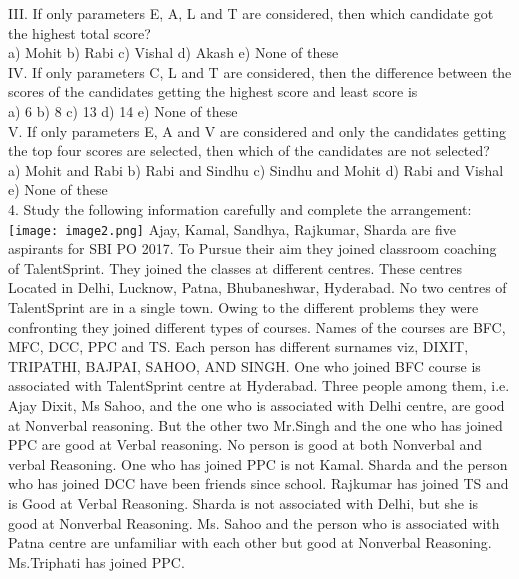 \documentclass[
]{article}
\begin{document}
III. If only parameters E, A, L and T are considered, then which candidate got the highest
total score?\\
a) Mohit \hspace{2mm}b) Rabi \hspace{2mm}c) Vishal \hspace{2mm}d) Akash \hspace{2mm}e) None of these\\

IV. If only parameters C, L and T are considered, then the difference between the scores
of the candidates getting the highest score and least score is\\
a) 6 \hspace{2mm}b) 8 \hspace{2mm}c) 13 \hspace{2mm}d) 14 \hspace{2mm}e) None of these\\

V. If only parameters E, A and V are considered and only the candidates getting the top
four scores are selected, then which of the candidates are not selected?\\
a) Mohit and Rabi \hspace{2mm}b) Rabi and Sindhu \hspace{2mm}c) Sindhu and Mohit
\hspace{2mm}d) Rabi and Vishal \hspace{2mm}e) None of these\\

4. Study the following information carefully and complete the arrangement:\\
\texttt{[image: image2.png]}
Ajay, Kamal, Sandhya, Rajkumar, Sharda are five aspirants for SBI PO 2017. To Pursue their
aim they joined classroom coaching of TalentSprint. They joined the classes at different
centres. These centres Located in Delhi, Lucknow, Patna, Bhubaneshwar, Hyderabad. No
two centres of TalentSprint are in a single town. Owing to the different problems they were
confronting they joined different types of courses. Names of the courses are BFC, MFC,
DCC, PPC and TS. Each person has different surnames viz, DIXIT, TRIPATHI, BAJPAI,
SAHOO, AND SINGH. One who joined BFC course is associated with TalentSprint centre at
Hyderabad. Three people among them, i.e. Ajay Dixit, Ms Sahoo, and the one who is
associated with Delhi centre, are good at Nonverbal reasoning. But the other two Mr.Singh
and the one who has joined PPC are good at Verbal reasoning. No person is good at both
Nonverbal and verbal Reasoning. One who has joined PPC is not Kamal. Sharda and the
person who has joined DCC have been friends since school. Rajkumar has joined TS and is
Good at Verbal Reasoning. Sharda is not associated with Delhi, but she is good at Nonverbal
Reasoning. Ms. Sahoo and the person who is associated with Patna centre are unfamiliar
with each other but good at Nonverbal Reasoning. Ms.Triphati has joined PPC.\\
\end{document}
